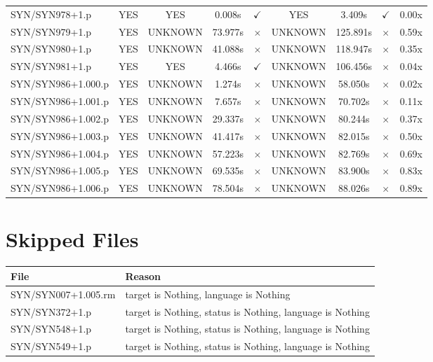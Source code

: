 \documentclass[a4paper,10pt]{article}
\begin{document}
\begin{longtable}{lcccccccc}
SYN/SYN978+1.p & YES & YES & 0.008s & \cellcolor{matchcolor}$\checkmark$ & YES & 3.409s & \cellcolor{matchcolor}$\checkmark$ & 0.00x \\
SYN/SYN979+1.p & YES & UNKNOWN & 73.977s & \cellcolor{mismatchcolor}$\times$ & UNKNOWN & 125.891s & \cellcolor{mismatchcolor}$\times$ & 0.59x \\
SYN/SYN980+1.p & YES & UNKNOWN & 41.088s & \cellcolor{mismatchcolor}$\times$ & UNKNOWN & 118.947s & \cellcolor{mismatchcolor}$\times$ & 0.35x \\
SYN/SYN981+1.p & YES & YES & 4.466s & \cellcolor{matchcolor}$\checkmark$ & UNKNOWN & 106.456s & \cellcolor{mismatchcolor}$\times$ & 0.04x \\
SYN/SYN986+1.000.p & YES & UNKNOWN & 1.274s & \cellcolor{mismatchcolor}$\times$ & UNKNOWN & 58.050s & \cellcolor{mismatchcolor}$\times$ & 0.02x \\
SYN/SYN986+1.001.p & YES & UNKNOWN & 7.657s & \cellcolor{mismatchcolor}$\times$ & UNKNOWN & 70.702s & \cellcolor{mismatchcolor}$\times$ & 0.11x \\
SYN/SYN986+1.002.p & YES & UNKNOWN & 29.337s & \cellcolor{mismatchcolor}$\times$ & UNKNOWN & 80.244s & \cellcolor{mismatchcolor}$\times$ & 0.37x \\
SYN/SYN986+1.003.p & YES & UNKNOWN & 41.417s & \cellcolor{mismatchcolor}$\times$ & UNKNOWN & 82.015s & \cellcolor{mismatchcolor}$\times$ & 0.50x \\
SYN/SYN986+1.004.p & YES & UNKNOWN & 57.223s & \cellcolor{mismatchcolor}$\times$ & UNKNOWN & 82.769s & \cellcolor{mismatchcolor}$\times$ & 0.69x \\
SYN/SYN986+1.005.p & YES & UNKNOWN & 69.535s & \cellcolor{mismatchcolor}$\times$ & UNKNOWN & 83.900s & \cellcolor{mismatchcolor}$\times$ & 0.83x \\
SYN/SYN986+1.006.p & YES & UNKNOWN & 78.504s & \cellcolor{mismatchcolor}$\times$ & UNKNOWN & 88.026s & \cellcolor{mismatchcolor}$\times$ & 0.89x \\
\bottomrule
\end{longtable}


\section{Skipped Files}

\begin{longtable}{ll}
\toprule
\textbf{File} & \textbf{Reason} \\
\midrule
\endhead
SYN/SYN007+1.005.rm & target is Nothing, language is Nothing \\
SYN/SYN372+1.p & target is Nothing, status is Nothing, language is Nothing \\
SYN/SYN548+1.p & target is Nothing, status is Nothing, language is Nothing \\
SYN/SYN549+1.p & target is Nothing, status is Nothing, language is Nothing \\
\bottomrule
\end{longtable}
\end{document}
